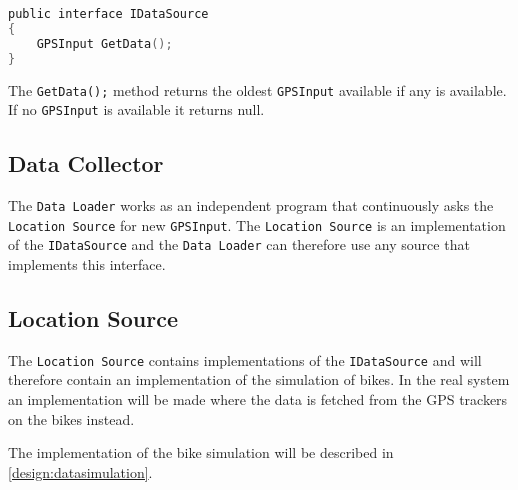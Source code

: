\begin{lstlisting}[language=C,caption=The IDataSource interface,label=idatasourcecode]
public interface IDataSource
{
	GPSInput GetData();
}
\end{lstlisting}

The \lstinline!GetData();! method returns the oldest \lstinline!GPSInput! available if any is available.
If no \lstinline!GPSInput! is available it returns null.

\subsection{Data Collector}
The \texttt{Data Loader} works as an independent program that continuously asks the \lstinline!Location Source! for new \lstinline!GPSInput!.
The \lstinline!Location Source! is an implementation of the \lstinline!IDataSource! and the \texttt{Data Loader} can therefore use any source that implements this interface.

\subsection{Location Source}\label{design:location_source}
The \texttt{Location Source} contains implementations of the \lstinline!IDataSource! and will therefore contain an implementation of the simulation of bikes.
In the real system an implementation will be made where the data is fetched from the GPS trackers on the bikes instead.

The implementation of the bike simulation will be described in \cref{design:datasimulation}.
 